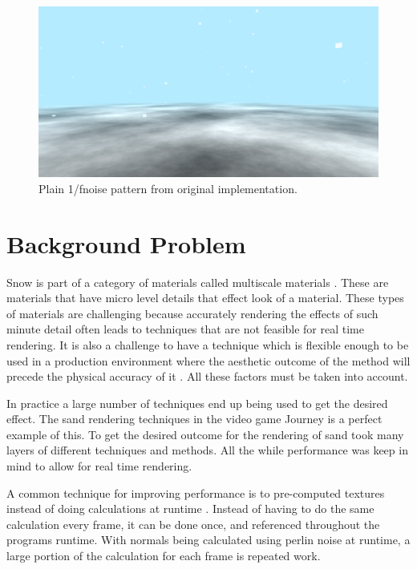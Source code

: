 \documentclass{IEEEtran}
\begin{document}
\begin{figure}
    \includegraphics[width=\linewidth]{images/fnoise.jpg}
    \caption{Plain 1/fnoise pattern from original implementation.}
    \label{fig:fnoise}
\end{figure}

\section{Background Problem}

Snow is part of a category of materials called multiscale materials
\cite{multiscale}. These are materials that have micro level details that
effect look of a material. These types of materials are challenging because
accurately rendering the effects of such minute detail often leads to techniques
that are not feasible for real time rendering. It is also a challenge to have a
technique which is flexible enough to be used in a production environment where
the aesthetic outcome of the method will precede the physical accuracy of it
\cite{sparkle}. All these factors must be taken into account.

In practice a large number of techniques end up being used to get the desired
effect. The sand rendering techniques in the video game Journey \cite{journey} is a perfect
example of this. To get the desired outcome for the rendering
of sand took many layers of different techniques and methods. All the while
performance was keep in mind to allow for real time rendering.

A common technique for improving performance is to pre-computed textures instead of
doing calculations at runtime \cite{journey}. Instead of having to do the same calculation
every frame, it can be done once, and referenced throughout the programs
runtime. With normals being calculated using perlin noise at runtime, a large
portion of the calculation for each frame is repeated work.
\end{document}
